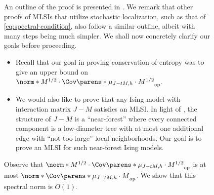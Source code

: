 \documentclass[11pt,letterpaper]{article}
\begin{document}
\begin{figure}

An outline of the proof is presented in . We remark that other proofs of MLSIs that utilize stochastic localization, such as that of \eqref{eq:spectral-condition}, also follow a similar outline, albeit with many steps being much simpler. We shall now concretely clarify our goals before proceeding. 
\begin{itemize}
    \item Recall that our goal in proving conservation of entropy was to give an upper bound on $\norm*{M^{1/2}\cdot\Cov\parens*{\mu_{J-tM, h}}\cdot M^{1/2}}_{\mathrm{op}}$.
    \item We would also like to prove that any Ising model with interaction matrix $J-M$ satisfies an MLSI.
    In light of , the structure of $J-M$ is a ``near-forest'' where every connected component is a low-diameter tree with at most one additional edge with ``not too large'' local neighborhoods.
    Our goal is to prove an MLSI for such near-forest Ising models.
\end{itemize}

Observe that $\norm*{M^{1/2}\cdot\Cov\parens*{\mu_{J-tM, h}}\cdot M^{1/2}}_{\mathrm{op}}$ is at most $\norm*{\Cov\parens*{\mu_{J-tM, h}} \cdot M}_{\mathrm{op}}$.
We show that this spectral norm is $O(1)$.


\end{figure}
\end{document}
